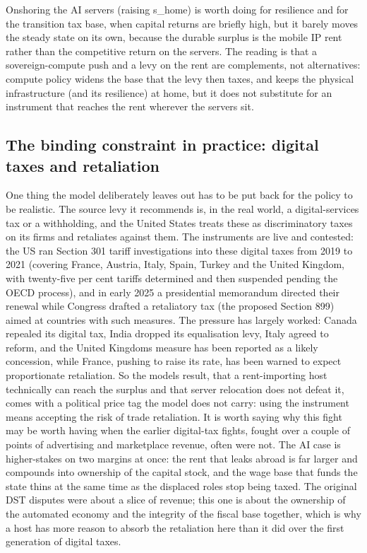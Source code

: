 \documentclass[12pt]{article}
\begin{document}
Onshoring the AI servers (raising s\_home) is worth doing for resilience
and for the transition tax base, when capital returns are briefly high,
but it barely moves the steady state on its own, because the durable
surplus is the mobile IP rent rather than the competitive return on the
servers. The reading is that a sovereign-compute push and a levy on the
rent are complements, not alternatives: compute policy widens the base
that the levy then taxes, and keeps the physical infrastructure (and its
resilience) at home, but it does not substitute for an instrument that
reaches the rent wherever the servers sit.

\hypertarget{the-binding-constraint-in-practice-digital-taxes-and-retaliation}{%
\subsection{The binding constraint in practice: digital taxes and
retaliation}\label{the-binding-constraint-in-practice-digital-taxes-and-retaliation}}

One thing the model deliberately leaves out has to be put back for the
policy to be realistic. The source levy it recommends is, in the real
world, a digital-services tax or a withholding, and the United States
treats these as discriminatory taxes on its firms and retaliates against
them. The instruments are live and contested: the US ran Section 301
tariff investigations into these digital taxes from 2019 to 2021
(covering France, Austria, Italy, Spain, Turkey and the United Kingdom,
with twenty-five per cent tariffs determined and then suspended pending
the OECD process), and in early 2025 a presidential memorandum directed
their renewal while Congress drafted a retaliatory tax (the proposed
Section 899) aimed at countries with such measures. The pressure has
largely worked: Canada repealed its digital tax, India dropped its
equalisation levy, Italy agreed to reform, and the United
Kingdom\textquotesingle s measure has been reported as a likely
concession, while France, pushing to raise its rate, has been warned to
expect proportionate retaliation. So the model\textquotesingle s result,
that a rent-importing host technically can reach the surplus and that
server relocation does not defeat it, comes with a political price tag
the model does not carry: using the instrument means accepting the risk
of trade retaliation. It is worth saying why this fight may be worth
having when the earlier digital-tax fights, fought over a couple of
points of advertising and marketplace revenue, often were not. The AI
case is higher-stakes on two margins at once: the rent that leaks abroad
is far larger and compounds into ownership of the capital stock, and the
wage base that funds the state thins at the same time as the displaced
roles stop being taxed. The original DST disputes were about a slice of
revenue; this one is about the ownership of the automated economy and
the integrity of the fiscal base together, which is why a host has more
reason to absorb the retaliation here than it did over the first
generation of digital taxes.
\end{document}
